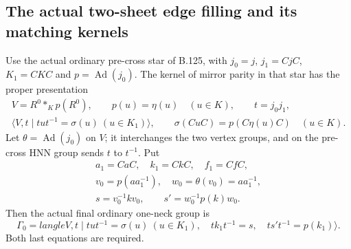 \subsection*{The actual two-sheet edge filling and its matching kernels}

\label{stmt:B134}
Use the actual ordinary pre-cross star of B.125, with
$j_0=j$, $j_1=CjC$, $K_1=CKC$ and $p=\operatorname{Ad}(j_0)$.
The kernel of mirror parity in that star has the proper presentation
\begin{equation}\label{eq:B134-pre-HNN}
 \begin{gathered}
 V=R^0*_{K}p(R^0),\qquad p(u)=\eta(u)\quad(u\in K),\qquad t=j_0j_1,\\
 \langle V,t\mid tut^{-1}=\sigma(u)\ (u\in K_1)\rangle,
 \qquad \sigma(CuC)=p(C\eta(u)C)\quad(u\in K).
 \end{gathered}
\end{equation}
Let $\theta=\operatorname{Ad}(j_0)$ on $V$; it interchanges the
two vertex groups, and on the pre-cross HNN group sends $t$ to
$t^{-1}$. Put
\begin{equation}\label{eq:B134-actual-words}
 \begin{gathered}
 a_1=CaC,\quad k_1=CkC,\quad f_1=CfC,\\
 v_0=p(aa_1^{-1}),\quad w_0=\theta(v_0)=aa_1^{-1},\\
 s=v_0^{-1}kv_0,\qquad s'=w_0^{-1}p(k)w_0.
 \end{gathered}
\end{equation}
Then the actual final ordinary one-neck group is
\begin{equation}\label{eq:B134-two-cross-presentation}
 \Gamma_0=langle V,t\mid
   tut^{-1}=\sigma(u)\ (u\in K_1),\quad
   tk_1t^{-1}=s,\quad ts't^{-1}=p(k_1)\rangle.
\end{equation}
Both last equations are required.

